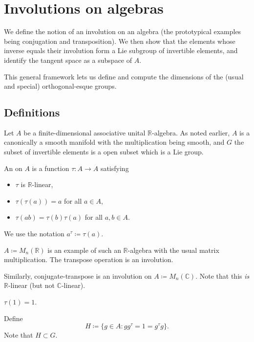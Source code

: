 \documentclass[12pt]{article}
\begin{document}
\section{Involutions on algebras}

We define the notion of an involution on an algebra (the prototypical examples being conjugation and transposition). 
We then show that the elements whose inverse equals their involution form a Lie subgroup of invertible elements, 
and identify the tangent space as a subspace of $A$.

This general framework lets us define and compute the dimensions of the (usual and special) orthogonal-esque groups.

\subsection{Definitions}

Let $A$ be a finite-dimensional associative unital $\mathbb{R}$-algebra. 
As noted earlier, $A$ is a canonically a smooth manifold with the multiplication being smooth, 
and $G$ the subset of invertible elements is a open subset which is a Lie group. 

\begin{defn}
	An  on $A$ is a function $\tau \colon A \to A$ satisfying
	\begin{itemize}
		\item $\tau$ is $\mathbb{R}$-linear,
		\item $\tau(\tau(a)) = a$ for all $a \in A$,
		\item $\tau(ab) = \tau(b) \tau(a)$ for all $a, b \in A$.
	\end{itemize}
\end{defn}
We use the notation $a^{\tau} \coloneqq \tau(a)$.

\begin{ex}
	$A \coloneqq M_{n}(\mathbb{R})$ is an example of such an $\mathbb{R}$-algebra with the usual matrix multiplication. \newline
	The transpose operation is an involution.

	Similarly, conjugate-transpose is an involution on $A \coloneqq M_{n}(\mathbb{C})$. Note that this \emph{is} $\mathbb{R}$-linear (but not $\mathbb{C}$-linear).
\end{ex}

\begin{lem}
	$\tau(1) = 1$.
\end{lem}

Define
\begin{equation*} 
	H \coloneqq \{g \in A : g g^{\tau} = 1 = g^{\tau} g\}.
\end{equation*}
Note that $H \subset G$.
\end{document}

